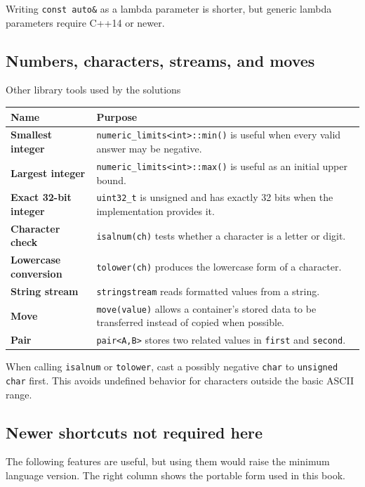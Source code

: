 Writing \texttt{const auto\&} as a lambda parameter is shorter, but generic
lambda parameters require C++14 or newer.

\subsection{Numbers, characters, streams, and moves}

\begin{revisionbox}{Other library tools used by the solutions}
\small
\setlength{\tabcolsep}{3pt}
\begin{tabularx}{\linewidth}{@{}>{\raggedright\arraybackslash\bfseries}p{3.0cm}X@{}}
\toprule
Name & Purpose \\
\midrule
Smallest integer & \texttt{numeric\_limits<int>::min()} is useful when every
valid answer may be negative. \\
Largest integer & \texttt{numeric\_limits<int>::max()} is useful as an initial
upper bound. \\
Exact 32-bit integer & \texttt{uint32\_t} is unsigned and has exactly 32 bits
when the implementation provides it. \\
Character check & \texttt{isalnum(ch)} tests whether a character is a letter
or digit. \\
Lowercase conversion & \texttt{tolower(ch)} produces the lowercase form of a
character. \\
String stream & \texttt{stringstream} reads formatted values from a string. \\
Move & \texttt{move(value)} allows a container's stored data to be transferred
instead of copied when possible. \\
Pair & \texttt{pair<A,B>} stores two related values in \texttt{first} and
\texttt{second}. \\
\bottomrule
\end{tabularx}
\end{revisionbox}

When calling \texttt{isalnum} or \texttt{tolower}, cast a possibly negative
\texttt{char} to \texttt{unsigned char} first. This avoids undefined behavior
for characters outside the basic ASCII range.

\subsection{Newer shortcuts not required here}

The following features are useful, but using them would raise the minimum
language version. The right column shows the portable form used in this book.

